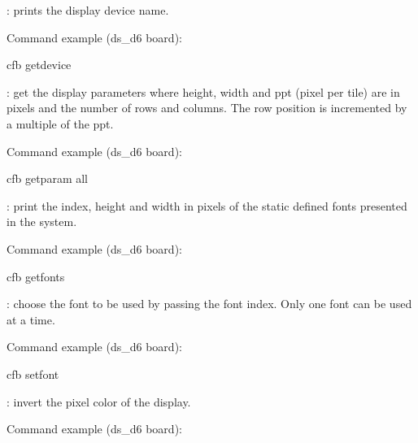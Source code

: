 \documentclass[letterpaper,10pt,english]{sphinxmanual}
\begin{document}
: prints the display device name.

Command example (ds\_d6 board):

\begin{sphinxVerbatim}[commandchars=\\\{\}]
 cfb get\PYGZus{}device
\end{sphinxVerbatim}

: get the display parameters where height, width and ppt
(pixel per tile) are in pixels and the number of rows and columns. The row
position is incremented by a multiple of the ppt.

Command example (ds\_d6 board):

\begin{sphinxVerbatim}[commandchars=\\\{\}]
 cfb get\PYGZus{}param all
\end{sphinxVerbatim}

: print the index, height and width in pixels of the static
defined fonts presented in the system.

Command example (ds\_d6 board):

\begin{sphinxVerbatim}[commandchars=\\\{\}]
 cfb get\PYGZus{}fonts
\end{sphinxVerbatim}

: choose the font to be used by passing the font index. Only one
font can be used at a time.

Command example (ds\_d6 board):

\begin{sphinxVerbatim}[commandchars=\\\{\}]
 cfb set\PYGZus{}font 
\end{sphinxVerbatim}

: invert the pixel color of the display.

Command example (ds\_d6 board):
\end{document}
